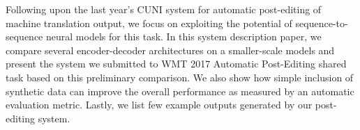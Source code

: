 Following upon the last year's CUNI system for automatic post-editing of machine translation output, we focus on exploiting the potential of sequence-to-sequence neural models for this task. In this system description paper, we compare several encoder-decoder architectures on a smaller-scale models and present the system we submitted to WMT 2017 Automatic Post-Editing shared task based on this preliminary comparison. We also show how simple inclusion of synthetic data can improve the overall performance as measured by an automatic evaluation metric. Lastly, we list few example outputs generated by our post-editing system.
